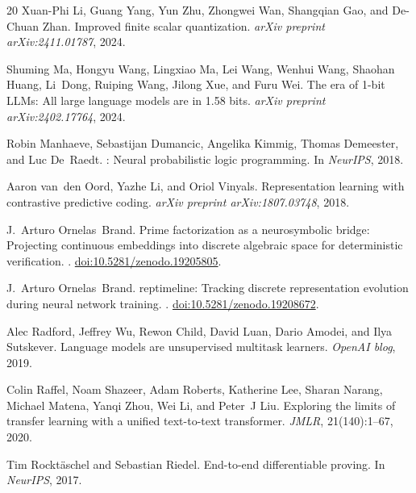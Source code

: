 \documentclass[11pt,a4paper]{article}
\begin{document}
\begin{thebibliography}{20}
Xuan-Phi Li, Guang Yang, Yun Zhu, Zhongwei Wan, Shangqian Gao, and De-Chuan Zhan.
\newblock Improved finite scalar quantization.
\newblock \emph{arXiv preprint arXiv:2411.01787}, 2024.

Shuming Ma, Hongyu Wang, Lingxiao Ma, Lei Wang, Wenhui Wang, Shaohan Huang, Li~Dong, Ruiping Wang, Jilong Xue, and Furu Wei.
\newblock The era of 1-bit {LLMs}: All large language models are in 1.58 bits.
\newblock \emph{arXiv preprint arXiv:2402.17764}, 2024.

Robin Manhaeve, Sebastijan Dumancic, Angelika Kimmig, Thomas Demeester, and Luc De~Raedt.
: Neural probabilistic logic programming.
\newblock In \emph{NeurIPS}, 2018.

Aaron van~den Oord, Yazhe Li, and Oriol Vinyals.
\newblock Representation learning with contrastive predictive coding.
\newblock \emph{arXiv preprint arXiv:1807.03748}, 2018.

J.~Arturo Ornelas~Brand.
\newblock Prime factorization as a neurosymbolic bridge: Projecting continuous embeddings into discrete algebraic space for deterministic verification.
.
\newblock \href{https://doi.org/10.5281/zenodo.19205805}{doi:10.5281/zenodo.19205805}.

J.~Arturo Ornelas~Brand.
\newblock reptimeline: Tracking discrete representation evolution during neural network training.
.
\newblock \href{https://doi.org/10.5281/zenodo.19208672}{doi:10.5281/zenodo.19208672}.

Alec Radford, Jeffrey Wu, Rewon Child, David Luan, Dario Amodei, and Ilya Sutskever.
\newblock Language models are unsupervised multitask learners.
\newblock \emph{OpenAI blog}, 2019.

Colin Raffel, Noam Shazeer, Adam Roberts, Katherine Lee, Sharan Narang, Michael Matena, Yanqi Zhou, Wei Li, and Peter~J Liu.
\newblock Exploring the limits of transfer learning with a unified text-to-text transformer.
\newblock \emph{JMLR}, 21(140):1--67, 2020.

Tim Rockt{\"a}schel and Sebastian Riedel.
\newblock End-to-end differentiable proving.
\newblock In \emph{NeurIPS}, 2017.


\end{thebibliography}
\end{document}
